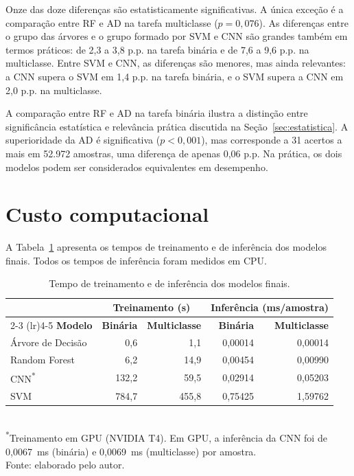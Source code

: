 Onze das doze diferenças são estatisticamente significativas. A única exceção é a comparação entre RF e AD na tarefa multiclasse ($p = 0{,}076$). As diferenças entre o grupo das árvores e o grupo formado por SVM e CNN são grandes também em termos práticos: de 2,3 a 3,8 p.p. na tarefa binária e de 7,6 a 9,6 p.p. na multiclasse. Entre SVM e CNN, as diferenças são menores, mas ainda relevantes: a CNN supera o SVM em 1,4 p.p. na tarefa binária, e o SVM supera a CNN em 2,0 p.p. na multiclasse.

A comparação entre RF e AD na tarefa binária ilustra a distinção entre significância estatística e relevância prática discutida na Seção~\ref{sec:estatistica}. A superioridade da AD é significativa ($p < 0{,}001$), mas corresponde a 31 acertos a mais em 52.972 amostras, uma diferença de apenas 0,06 p.p. Na prática, os dois modelos podem ser considerados equivalentes em desempenho.

\section{Custo computacional}
\label{sec:res-custo}

A Tabela~\ref{tab:custo} apresenta os tempos de treinamento e de inferência dos modelos finais. Todos os tempos de inferência foram medidos em CPU.

\begin{table}[htbp]
\centering
\caption{Tempo de treinamento e de inferência dos modelos finais.}
\label{tab:custo}
\begin{tabular}{lrrrr}
\toprule
 & \multicolumn{2}{c}{\textbf{Treinamento (s)}} & \multicolumn{2}{c}{\textbf{Inferência (ms/amostra)}} \\
\cmidrule(lr){2-3} \cmidrule(lr){4-5}
\textbf{Modelo} & \textbf{Binária} & \textbf{Multiclasse} & \textbf{Binária} & \textbf{Multiclasse} \\
\midrule
Árvore de Decisão &   0,6 &   1,1 & 0,00014 & 0,00014 \\
Random Forest     &   6,2 &  14,9 & 0,00454 & 0,00990 \\
CNN\textsuperscript{*} & 132,2 &  59,5 & 0,02914 & 0,05203 \\
SVM               & 784,7 & 455,8 & 0,75425 & 1,59762 \\
\bottomrule
\end{tabular}
\\[2pt]
\small{\textsuperscript{*}Treinamento em GPU (NVIDIA T4). Em GPU, a inferência da CNN foi de 0,0067~ms (binária) e 0,0069~ms (multiclasse) por amostra.}\\
\small{Fonte: elaborado pelo autor.}
\end{table}

